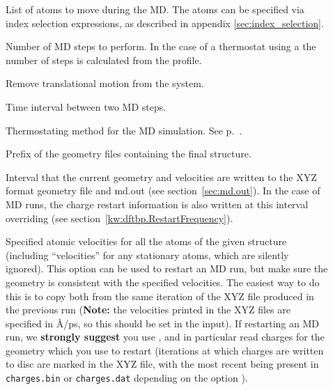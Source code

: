 \begin{description}
\item[] List of atoms to move during the MD. The atoms can be specified via index
selection expressions, as described in appendix \ref{sec:index_selection}.

\item[] Number of MD steps to perform. In the case of a
  thermostat using a  the number of steps is
  calculated from the profile.

\item[] Remove translational motion from the system.


\item[] Time interval between two
  MD steps.

\item[] Thermostating method for the MD simulation. See
  p.~.

\item[] Prefix of the geometry files containing the
  final structure.

\item[] Interval that the current geometry and
  velocities are written to the XYZ format geometry file and md.out
  (see section~\ref{sec:md.out}). In the case of  MD runs, the
  charge restart information is also written at this interval
  overriding  (see
  section~\ref{kw:dftbp.RestartFrequency}).

\item[] Specified atomic velocities for
  all the atoms of the given structure (including ``velocities'' for any
  stationary atoms, which are silently ignored). This option can be used to
  restart an MD run, but make sure the geometry is consistent with the specified
  velocities. The easiest way to do this is to copy both from the same iteration
  of the XYZ file produced in the previous run (\textbf{Note:} the velocities
  printed in the XYZ files are specified in {\AA}/ps, so this should be set in
  the input). If restarting an  MD run, we \textbf{strongly suggest} you
  use , and in particular read charges for the geometry
  which you use to restart (iterations at which charges are written to disc are
  marked in the XYZ file, with the most recent being present in
  \verb|charges.bin| or \verb|charges.dat| depending on the option
  ).


\end{description}
